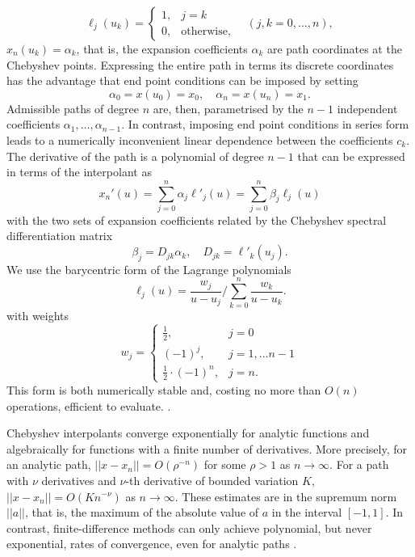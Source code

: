 \[
\ell_{j}(u_{k})=\begin{cases}
1, & j=k\\
0, & \text{otherwise,}
\end{cases}\quad(j,k=0,\ldots,n),
\]
 $x_{n}(u_{k})=\alpha_{k}$, that is, the expansion coefficients $\alpha_{k}$
are path coordinates at the Chebyshev points. Expressing the entire
path in terms its discrete coordinates has the advantage that end
point conditions can be imposed by setting
\begin{equation}
\alpha_{0}=x(u_{0})=x_{0},\quad\alpha_{n}=x(u_{n})=x_{1}.
\end{equation}
Admissible paths of degree $n$ are, then, parametrised by the $n-1$
independent coefficients $\alpha_{1},\ldots,\alpha_{n-1}$. In contrast,
imposing end point conditions in series form leads to a numerically
inconvenient linear dependence between the coefficients $c_{k}$.
The derivative of the path is a polynomial of degree $n-1$ that can
be expressed in terms of the interpolant as
\begin{equation}
x_{n}'(u)=\sum_{j=0}^{n}\alpha_{j}\ell'_{j}(u)=\sum_{j=0}^{n}\beta_{j}\ell_{j}(u)
\end{equation}
with the two sets of expansion coefficients related by the Chebyshev
spectral differentiation matrix
\begin{equation}
\beta_{j}=D_{jk}\alpha_{k},\quad D_{jk}=\ell'_{k}(u_{j}).
\end{equation}
We use the barycentric form of the Lagrange polynomials \citep{hamming2012numerical}
\begin{equation}
\ell_{j}(u)=\frac{w_{j}}{u-u_{j}}\bigg/\sum_{k=0}^{n}\frac{w_{k}}{u-u_{k}}.
\end{equation}
with weights \citep{salzer1972lagrangian}
\[
w_{j}=\begin{cases}
\frac{1}{2}, & j=0\\
(-1)^{j}, & j=1,\ldots n-1\\
\frac{1}{2}\cdot(-1)^{n}, & j=n.
\end{cases}
\]
This form is both numerically stable and, costing no more than $O(n)$
operations, efficient to evaluate. \citep{berrut2004barycentric}. 

Chebyshev interpolants converge exponentially for analytic functions
and algebraically for functions with a finite number of derivatives.
More precisely, for an analytic path, $||x-x_{n}||=O(\rho^{-n})$
for some $\rho>1$ as $n\rightarrow\infty$. For a path with $\nu$
derivatives and $\nu$-th derivative of bounded variation $K$, $||x-x_{n}||=O(Kn^{-\nu})$
as $n\rightarrow\infty$. These estimates are in the supremum norm
$||a||$, that is, the maximum of the absolute value of $a$ in the
interval $[-1,1].$ In contrast, finite-difference methods can only
achieve polynomial, but never exponential, rates of convergence, even
for analytic paths \citep{trefethen2000spectral,boyd2001chebyshev}.

